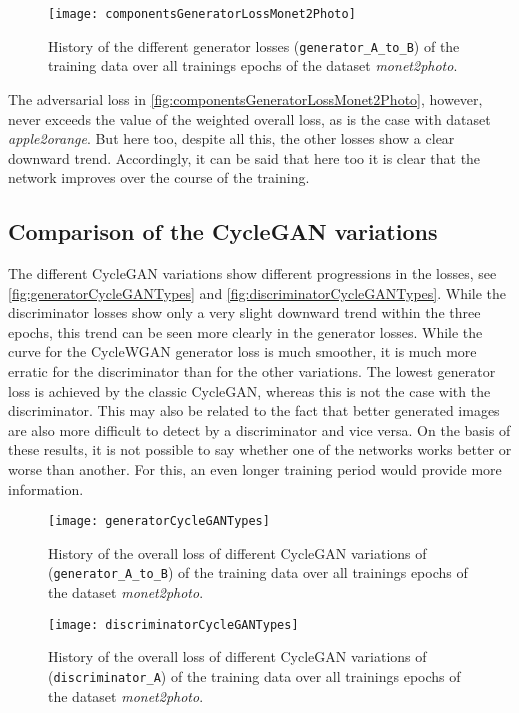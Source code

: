 \documentclass[fleqn,10pt]{SelfArx} %
\begin{document}
\begin{figure}[htb] 
	\centering 
	\texttt{[image: componentsGeneratorLossMonet2Photo]}
	\caption{History of the different generator losses (\texttt{generator\_A\_to\_B}) of the training data over all trainings epochs of the dataset \textit{monet2photo}.}
	\label{fig:componentsGeneratorLossMonet2Photo}
\end{figure}

The adversarial loss in \autoref{fig:componentsGeneratorLossMonet2Photo}, however, never exceeds the value of the weighted overall loss, as is the case with dataset \textit{apple2orange}. But here too, despite all this, the other losses show a clear downward trend. Accordingly, it can be said that here too it is clear that the network improves over the course of the training.

\subsection{Comparison of the Cycle\ac{GAN} variations}
The different Cycle\ac{GAN} variations show different progressions in the losses, see \autoref{fig:generatorCycleGANTypes} and \autoref{fig:discriminatorCycleGANTypes}. While the discriminator losses show only a very slight downward trend within the three epochs, this trend can be seen more clearly in the generator losses. While the curve for the Cycle\ac{WGAN} generator loss is much smoother, it is much more erratic for the discriminator than for the other variations. The lowest generator loss is achieved by the classic Cycle\ac{GAN}, whereas this is not the case with the discriminator. This may also be related to the fact that better generated images are also more difficult to detect by a discriminator and vice versa. On the basis of these results, it is not possible to say whether one of the networks works better or worse than another. For this, an even longer training period would provide more information. 

\begin{figure}[htb] 
	\centering 
	\texttt{[image: generatorCycleGANTypes]}
	\caption{History of the overall loss of different Cycle\ac{GAN} variations of (\texttt{generator\_A\_to\_B}) of the training data over all trainings epochs of the dataset \textit{monet2photo}.}
	\label{fig:generatorCycleGANTypes}
\end{figure}

\begin{figure}[htb] 
	\centering 
	\texttt{[image: discriminatorCycleGANTypes]}
	\caption{History of the overall loss of different Cycle\ac{GAN} variations of (\texttt{discriminator\_A}) of the training data over all trainings epochs of the dataset \textit{monet2photo}.}
	\label{fig:discriminatorCycleGANTypes}
\end{figure}
\end{document}
